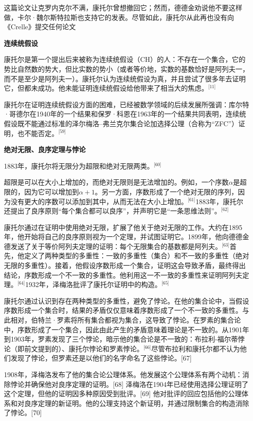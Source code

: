 这篇论文让克罗内克尔不满，康托尔曾想撤回它；然而，德德金劝说他不要这样做，卡尔·魏尔斯特拉斯也支持它的发表。尽管如此，康托尔从此再也没有向《Crelle》提交任何论文

\textbf{连续统假设}

康托尔是第一个提出后来被称为连续统假设（CH）的人：不存在一个集合，它的势比自然数的势大，但比实数的势小（或者等价地，实数的基数恰好是阿列夫一，而不是至少是阿列夫一）。康托尔认为连续统假设为真，并且尝试了很多年去证明它，但都未成功。他未能证明连续统假设给他带来了相当大的焦虑。\(^\text{[11]}\)

康托尔在证明连续统假设方面的困难，已经被数学领域的后续发展所强调：库尔特·哥德尔在1940年的一个结果和保罗·科恩在1963年的一个结果共同表明，连续统假设既不能通过标准的泽尔梅洛–弗兰克尔集合论加选择公理（合称为“ZFC”）证明，也不能否定。\(^\text{[59]}\)

\textbf{绝对无限、良序定理与悖论}

1883年，康托尔将无限分为超限和绝对无限两类。\(^\text{[60]}\)

超限是可以在大小上增加的，而绝对无限则是无法增加的。例如，一个序数\(\alpha\)是超限的，因为它可以增加到\(\alpha+1\)。另一方面，序数形成了一个绝对无限的序列，因为没有更大的序数可以添加到其中，从而无法在大小上增加。\(^\text{[61]}\)1883年，康托尔还提出了良序原则“每个集合都可以良序”，并声明它是“一条思维法则”。\(^\text{[62]}\)

康托尔通过在证明中使用绝对无限，扩展了他关于绝对无限的工作。大约在1895年，他开始将自己的良序原则视为一个定理，并试图证明它。1899年，他向德德金德发送了关于等价阿列夫定理的证明：每个无限集合的基数都是阿列夫。\(^\text{[63]}\)首先，他定义了两种类型的多重性：一致的多重性（集合）和不一致的多重性（绝对无限的多重性）。接着，他假设序数形成一个集合，证明这会导致矛盾，最终得出结论，序数形成一个不一致的多重性。他利用这一不一致的多重性来证明阿列夫定理。\(^\text{[64]}\)1932年，泽梅洛批评了康托尔证明中的构造。\(^\text{[65]}\)

康托尔通过认识到存在两种类型的多重性，避免了悖论。在他的集合论中，当假设序数形成一个集合时，结果的矛盾仅仅意味着序数形成了一个不一致的多重性。与此相对，伯特兰·罗素将所有集合都视为集合，这导致了悖论。在罗素的集合论中，序数形成了一个集合，因此由此产生的矛盾意味着理论是不一致的。从1901年到1903年，罗素发现了三个悖论，暗示他的集合论是不一致的：布拉利-福尔蒂悖论（即前文提到的）、康托尔悖论和罗素悖论。\(^\text{[66]}\)尽管布拉利和康托尔都不认为他们发现了悖论，但罗素还是以他们的名字命名了这些悖论。[67]

1908年，泽梅洛发布了他的集合论公理体系。他发展这个公理体系有两个动机：消除悖论并确保他对良序定理的证明。[68] 泽梅洛在1904年已经使用选择公理证明了这个定理，但他的证明因多种原因受到批评。[69] 他对批评的回应包括他的公理体系和对良序定理的新证明。他的公理支持这个新证明，并通过限制集合的构造消除了悖论。[70]

